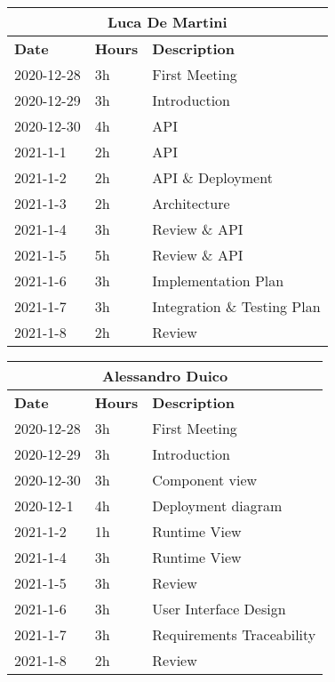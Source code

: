 
\begin{table}[H]
    \centering
    \begin{tabular}{|l|l|l|}
        \multicolumn{3}{c}{\textbf{Luca De Martini}}                   \\
        \hline
        \textbf{Date} & \textbf{Hours} & \textbf{Description}          \\\hline
        2020-12-28    & 3h             & First Meeting       \\\hline
        2020-12-29    & 3h             & Introduction       \\\hline
        2020-12-30    & 4h             & API       \\\hline
        2021-1-1    & 2h             & API       \\\hline
        2021-1-2    & 2h             & API \& Deployment       \\\hline
        2021-1-3    & 2h             & Architecture       \\\hline
        2021-1-4    & 3h             & Review \& API       \\\hline
        2021-1-5    & 5h             & Review \& API       \\\hline
        2021-1-6    & 3h             & Implementation Plan       \\\hline
        2021-1-7    & 3h             & Integration \& Testing Plan       \\\hline
        2021-1-8    & 2h             & Review       \\\hline
    \end{tabular}
\end{table}
\begin{table}[H]
    \centering
    \begin{tabular}{|l|l|l|}
        \multicolumn{3}{c}{\textbf{Alessandro Duico}}                      \\
        \hline
        \textbf{Date} & \textbf{Hours} & \textbf{Description}              \\\hline
        2020-12-28    & 3h             & First Meeting           \\\hline
        2020-12-29    & 3h             & Introduction       \\\hline
        2020-12-30    & 3h             & Component view     \\\hline
        2020-12-1     & 4h             & Deployment diagram \\\hline
        2021-1-2     & 1h             & Runtime View   \\\hline
        2021-1-4     & 3h             & Runtime View   \\\hline
        2021-1-5     & 3h             & Review \\\hline
        2021-1-6    & 3h               & User Interface Design \\\hline
        2021-1-7    & 3h               & Requirements Traceability \\\hline
        2021-1-8    & 2h                & Review
    \end{tabular}
\end{table}

